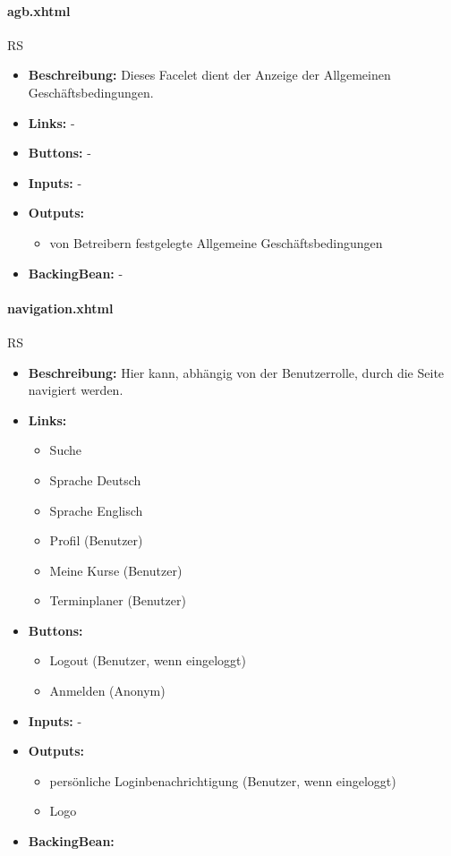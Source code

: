 				\paragraph{agb.xhtml}
					RS\\
					\begin{itemize}
						\item \textbf{Beschreibung:} Dieses Facelet dient der Anzeige der Allgemeinen Geschäftsbedingungen.
						\item \textbf{Links:} -
						\item \textbf{Buttons:} -
						\item \textbf{Inputs:} -
						\item \textbf{Outputs:}
							\begin{itemize}
								\item von Betreibern festgelegte Allgemeine Geschäftsbedingungen
							\end{itemize}
						\item \textbf{BackingBean:} -
					\end{itemize}
				\paragraph{navigation.xhtml}
					RS\\
					\begin{itemize}
						\item \textbf{Beschreibung:} Hier kann, abhängig von der Benutzerrolle, durch die Seite navigiert werden.
						\item \textbf{Links:}
							\begin{itemize}
								\item Suche
								\item Sprache Deutsch
								\item Sprache Englisch
								\item Profil (Benutzer)
								\item Meine Kurse (Benutzer)
								\item Terminplaner (Benutzer)
							\end{itemize}
						\item \textbf{Buttons:}
							\begin{itemize}
								\item Logout (Benutzer, wenn eingeloggt)
								\item Anmelden (Anonym)
							\end{itemize}
						\item \textbf{Inputs:} -
						\item \textbf{Outputs:}
							\begin{itemize}
								\item persönliche Loginbenachrichtigung (Benutzer, wenn eingeloggt)
								\item Logo
							\end{itemize}
						\item \textbf{BackingBean:}
					\end{itemize}
		
